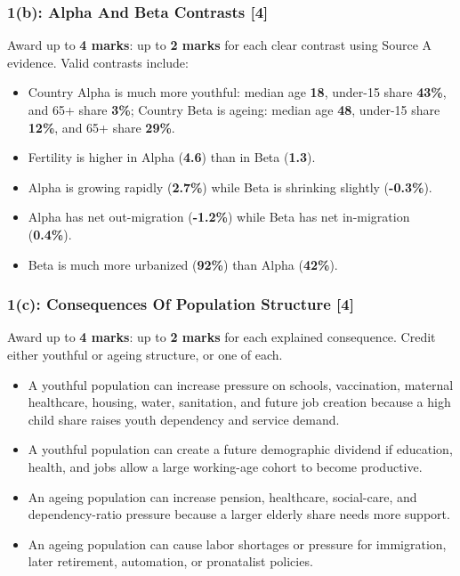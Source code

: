 \documentclass[11pt,a4paper]{article}
\newcommand{\term}[1]{\textcolor{HeadingBlue}{\textbf{#1}}}
\newcommand{\score}[1]{\textcolor{AccentTeal}{\textbf{#1}}}
\begin{document}
\subsubsection{1(b): Alpha And Beta Contrasts [4]}

Award up to \score{4 marks}: up to \score{2 marks} for each clear contrast
using Source A evidence. Valid contrasts include:

\begin{itemize}
  \item Country Alpha is much more youthful: median age \term{18}, under-15
  share \term{43\%}, and 65+ share \term{3\%}; Country Beta is ageing: median
  age \term{48}, under-15 share \term{12\%}, and 65+ share \term{29\%}.
  \item Fertility is higher in Alpha (\term{4.6}) than in Beta (\term{1.3}).
  \item Alpha is growing rapidly (\term{2.7\%}) while Beta is shrinking
  slightly (\term{-0.3\%}).
  \item Alpha has net out-migration (\term{-1.2\%}) while Beta has net
  in-migration (\term{0.4\%}).
  \item Beta is much more urbanized (\term{92\%}) than Alpha (\term{42\%}).
\end{itemize}

\subsubsection{1(c): Consequences Of Population Structure [4]}

Award up to \score{4 marks}: up to \score{2 marks} for each explained
consequence. Credit either youthful or ageing structure, or one of each.

\begin{itemize}
  \item A youthful population can increase pressure on schools, vaccination,
  maternal healthcare, housing, water, sanitation, and future job creation
  because a high child share raises youth dependency and service demand.
  \item A youthful population can create a future demographic dividend if
  education, health, and jobs allow a large working-age cohort to become
  productive.
  \item An ageing population can increase pension, healthcare, social-care, and
  dependency-ratio pressure because a larger elderly share needs more support.
  \item An ageing population can cause labor shortages or pressure for
  immigration, later retirement, automation, or pronatalist policies.
\end{itemize}
\end{document}
